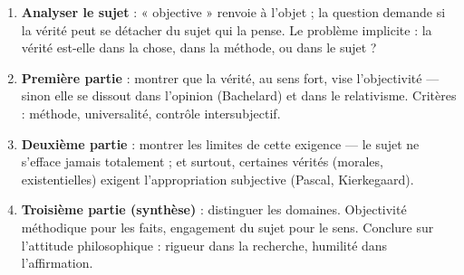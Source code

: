 \documentclass[11pt]{article}
\begin{document}
\begin{methode}
\begin{enumerate}
\item \textbf{Analyser le sujet} : « objective » renvoie à l'objet ; la question demande si la vérité peut se détacher du sujet qui la pense. Le problème implicite : la vérité est-elle dans la chose, dans la méthode, ou dans le sujet ?
\item \textbf{Première partie} : montrer que la vérité, au sens fort, vise l'objectivité — sinon elle se dissout dans l'opinion (Bachelard) et dans le relativisme. Critères : méthode, universalité, contrôle intersubjectif.
\item \textbf{Deuxième partie} : montrer les limites de cette exigence — le sujet ne s'efface jamais totalement ; et surtout, certaines vérités (morales, existentielles) exigent l'appropriation subjective (Pascal, Kierkegaard).
\item \textbf{Troisième partie (synthèse)} : distinguer les domaines. Objectivité méthodique pour les faits, engagement du sujet pour le sens. Conclure sur l'attitude philosophique : rigueur dans la recherche, humilité dans l'affirmation.
\end{enumerate}
\end{methode}
\end{document}
